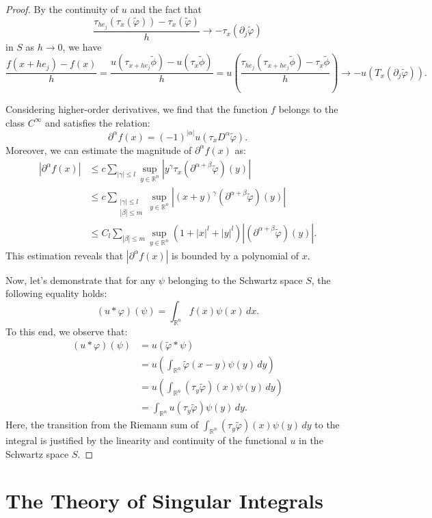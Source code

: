 \documentclass[12pt,openany]{book}
\theoremstyle{definition}
\begin{document}
\begin{proof}
By the continuity of $u$ and the fact that
$$
\frac{\tau_{h e_j}(\tau_x(\tilde{\varphi})) - \tau_x(\tilde{\varphi})}{h} \rightarrow -\tau_x(\partial_j \tilde{\varphi})
$$
in $S$ as $h \rightarrow 0$, we have
    $$
    \frac{f(x+he_j)-f(x)}{h}=\frac{u(\tau_{x+he_j} \tilde{\phi})-u(\tau_x \tilde{\phi})}{h}=u(\frac{\tau_{he_j}( \tau_{x+he_j}\tilde{\phi})-\tau_x \tilde{\phi}}{h}) \rightarrow -u(T_x(\partial_j \tilde{\varphi})).
    $$

Considering higher-order derivatives, we find that the function $f$ belongs to the class $C^{\infty}$ and satisfies the relation:
$$
\partial^\alpha f(x) = (-1)^{|\alpha|} u(\tau_x D^\alpha \tilde{\varphi}).
$$
Moreover, we can estimate the magnitude of $\partial^\alpha f(x)$ as:
$$
\begin{aligned}
|\partial^\alpha f(x)| &\leq c \sum_{|\gamma| \leq l} \sup_{y \in \mathbb{R}^n} |y^\gamma \tau_x(\partial^{\alpha+\beta} \tilde{\varphi})(y)| \\
&\leq c \sum_{\substack{|\gamma| \leq l \\ |\beta| \leq m}} \sup_{y \in \mathbb{R}^n} |(x+y)^\gamma (\partial^{\alpha+\beta} \tilde{\varphi})(y)| \\
&\leq C_l \sum_{|\beta| \leq m} \sup_{y \in \mathbb{R}^n} (1 + |x|^l + |y|^l) |(\partial^{\alpha+\beta} \tilde{\varphi})(y)|.
\end{aligned}
$$
This estimation reveals that $|\partial^\alpha f(x)|$ is bounded by a polynomial of $x$.

Now, let's demonstrate that for any $\psi$ belonging to the Schwartz space $S$, the following equality holds:
$$
(u * \varphi)(\psi) = \int_{\mathbb{R}^n} f(x) \psi(x) \, dx.
$$
To this end, we observe that:
$$
\begin{aligned}
(u * \varphi)(\psi) &= u(\tilde{\varphi} * \psi) \\
&= u\left( \int_{\mathbb{R}^n} \tilde{\varphi}(x-y) \psi(y) \, dy \right) \\
&= u\left( \int_{\mathbb{R}^n} (\tau_y \tilde{\varphi})(x) \psi(y) \, dy \right) \\
&= \int_{\mathbb{R}^n} u(\tau_y \tilde{\varphi}) \psi(y) \, dy.
\end{aligned}
$$
Here, the transition from the Riemann sum of $\int_{\mathbb{R}^n} (\tau_y \tilde{\varphi})(x) \psi(y) \, dy$ to the integral is justified by the linearity and continuity of the functional $u$ in the Schwartz space $S$.
\end{proof}
\chapter{The Theory of Singular Integrals}
\end{document}
